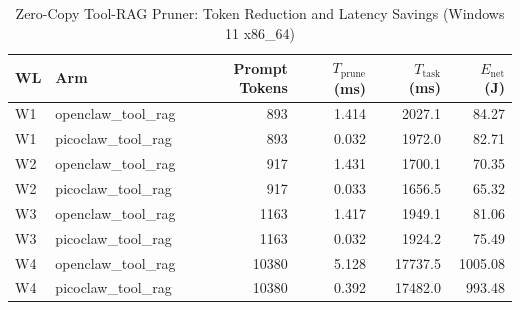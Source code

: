 \begin{table}[t]
\centering\small
\caption{Zero-Copy Tool-RAG Pruner: Token Reduction and Latency Savings (Windows 11 x86_64)}
\label{tab:Windows_tool_rag}
\begin{tabular}{llrrrr}
\toprule
WL & Arm & Prompt Tokens & $T_{\text{prune}}$ (ms) & $T_{\text{task}}$ (ms) & $E_{\text{net}}$ (J) \\
\midrule
W1 & openclaw\_tool\_rag & 893 & 1.414 & 2027.1 & 84.27 \\
W1 & picoclaw\_tool\_rag & 893 & 0.032 & 1972.0 & 82.71 \\
W2 & openclaw\_tool\_rag & 917 & 1.431 & 1700.1 & 70.35 \\
W2 & picoclaw\_tool\_rag & 917 & 0.033 & 1656.5 & 65.32 \\
W3 & openclaw\_tool\_rag & 1163 & 1.417 & 1949.1 & 81.06 \\
W3 & picoclaw\_tool\_rag & 1163 & 0.032 & 1924.2 & 75.49 \\
W4 & openclaw\_tool\_rag & 10380 & 5.128 & 17737.5 & 1005.08 \\
W4 & picoclaw\_tool\_rag & 10380 & 0.392 & 17482.0 & 993.48 \\
\bottomrule
\end{tabular}
\end{table}
